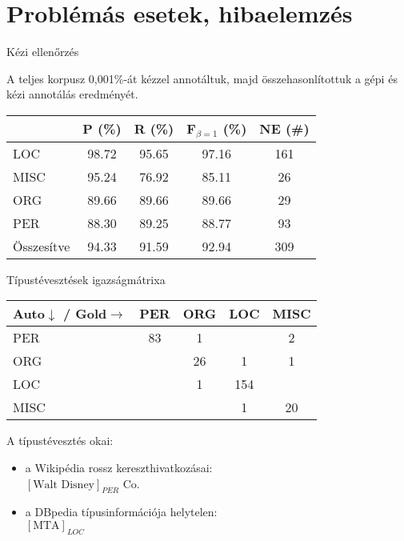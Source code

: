 \documentclass[utf8x,t]{beamer}
\begin{document}
\section{Problémás esetek, hibaelemzés}

\begin{frame}{Kézi ellenőrzés}

\bigskip

A teljes korpusz 0,001\%-át kézzel annotáltuk, majd összehasonlítottuk a gépi és kézi annotálás eredményét.

\bigskip

\begin{center}
\begin{tabular}{lcccc}
\toprule
& P (\%) &  R (\%) & F$_{\beta=1}$ (\%) & NE (\#) \\
\midrule
LOC     &   98.72 &  95.65 &  97.16 & 161 \\
MISC    &   95.24 &  76.92 &  85.11 & 26 \\
ORG     &   89.66 &  89.66 &  89.66 & 29 \\
PER     &   88.30 &  89.25 &  88.77 & 93 \\
\midrule
Összesítve &   94.33 &  91.59 &  92.94 & 309 \\
\bottomrule
\end{tabular} 
\end{center}

\end{frame}

\begin{frame}{Típustévesztések igazságmátrixa}

\bigskip

\begin{center}
\begin{tabular}{l@{\hspace{0.5em}}|@{\hspace{0.5em}}cccc}
\toprule
Auto$\downarrow$ / Gold$\rightarrow$ & PER & ORG & LOC & MISC \\
\midrule
PER & 83 & 1 & & 2 \\
ORG &  & 26 & 1 & 1 \\
LOC &  & 1 & 154 & \\
MISC &  &  & 1 & 20 \\
\bottomrule
\end{tabular}
\end{center}

\bigskip

A típustévesztés okai:

\begin{itemize}
\item a Wikipédia rossz kereszthivatkozásai: \\ $[\mbox{Walt Disney}]_{PER}$ Co.
\item a DBpedia típusinformációja helytelen: \\ $[\mbox{MTA}]_{LOC}$
\end{itemize}

\end{frame}
\end{document}
